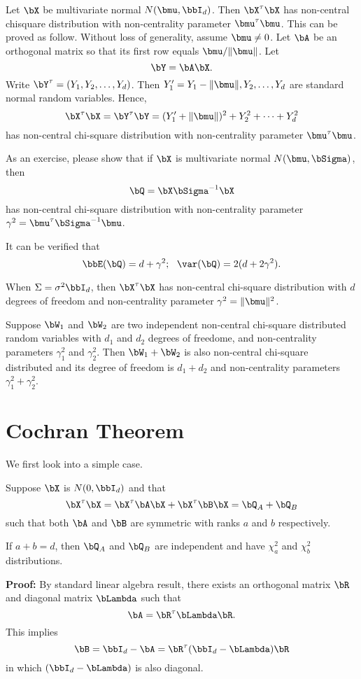 Let $\bX$ be multivariate normal $N(\bmu, \bbI_d)$. Then
$\bX^\tau \bX$ has non-central chisquare distribution
with non-centrality parameter $\bmu^\tau \bmu$.
This can be proved as follow. Without loss of generality,
assume $\bmu \neq 0$. Let $\bA$ be an orthogonal
matrix so that its first row equals $\bmu/\|\bmu\|$.
Let
\[
\bY = \bA \bX.
\]
Write $\bY^\tau = (Y_1, Y_2, \ldots, Y_d)$. Then
$Y_1'=Y_1 - \|\bmu\|, Y_2, \ldots, Y_d$ are \iid standard normal random
variables. Hence,
\[
\bX^\tau \bX = \bY^\tau \bY
=
(Y'_1+\|\bmu\|)^2 + Y_2^2 + \cdots + Y_d^2
\]
has non-central chi-square distribution with
non-centrality parameter $\bmu^\tau \bmu$.

As an exercise, please show that
if $\bX$ is multivariate normal $N(\bmu, \bSigma)$,
then
\[
\bQ = \bX \bSigma^{-1} \bX
\]
has non-central chi-square distribution with
non-centrality parameter $\gamma^2 = \bmu^\tau \bSigma^{-1} \bmu$.

It can be verified that
\[
\bbE (\bQ) = d + \gamma^2; ~~ \var(\bQ) = 2(d + 2 \gamma^2).
\]

When $\Sigma = \sigma^2 \bbI_d$, then
$\bX^\tau \bX$ has non-central chi-square distribution
with $d$ degrees of freedom and non-centrality parameter
$\gamma^2 = \|\bmu\|^2$.

Suppose $\bW_1$ and $\bW_2$ are two independent
non-central chi-square distributed random variables
with $d_1$ and $d_2$ degrees of freedome,
and non-centrality parameters $\gamma_1^2$ and $\gamma_2^2$.
Then $\bW_1 + \bW_2$ is also non-central chi-square distributed
and its degree of freedom is $d_1 + d_2$ and
non-centrality parameters $\gamma_1^2+\gamma_2^2$.

\section{Cochran Theorem}

We first look into a simple case.

\begin{theorem}
Suppose $\bX$ is $N(0, \bbI_d)$ and that
\[
\bX^\tau \bX = \bX^\tau \bA \bX + \bX^\tau \bB \bX
= \bQ_A + \bQ_B
\]
such that both $\bA$ and $\bB$ are symmetric with
ranks $a$ and $b$ respectively.

If $a+b = d$, then $\bQ_A$ and $\bQ_B$ are independent
and have $\chi_a^2$ and $\chi_b^2$ distributions.
\end{theorem}

\vs\no
{\bf Proof:}
By standard linear algebra result, there exists an orthogonal
matrix $\bR$ and diagonal matrix $\bLambda$ such that
\[
\bA = \bR^\tau \bLambda \bR.
\]
This implies
\[
\bB = \bbI_d - \bA = \bR^\tau (\bbI_d - \bLambda) \bR
\]
in which $(\bbI_d - \bLambda)$ is also diagonal.

